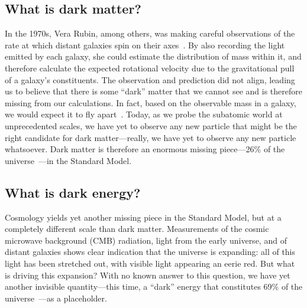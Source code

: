 \subsection{What is dark matter?}
In the 1970s, Vera Rubin, among others, was making careful observations of the rate at which distant galaxies spin on their axes~\cite{VeraRubin}.  
By also recording the light emitted by each galaxy, she could estimate the distribution of mass within it, and therefore calculate the expected rotational velocity due to the gravitational pull of a galaxy's constituents. 
The observation and prediction did not align, leading us to believe that there is some ``dark'' matter that we cannot see and is therefore missing from our calculations. 
In fact, based on the observable mass in a galaxy, we would expect it to fly apart~\cite{GalaxyDM}. 
Today, as we probe the subatomic world at unprecedented scales, we have yet to observe any new particle that might be the right candidate for dark matter---really, we have yet to observe any new particle whatsoever. 
Dark matter is therefore an enormous missing piece---26\% of the universe~\cite{PlanckDM}---in the Standard Model.

\subsection{What is dark energy?}
Cosmology yields yet another missing piece in the Standard Model, but at a completely different scale than dark matter. 
Measurements of the cosmic microwave background (CMB) radiation, light from the early universe, and of distant galaxies shows clear indication that the universe is expanding: all of this light has been stretched out, with visible light appearing an eerie red. 
But what is driving this expansion? 
With no known answer to this question, we have yet another invisible quantity---this time, a ``dark'' energy that constitutes 69\% of the universe~\cite{PlanckDM}---as a placeholder.

